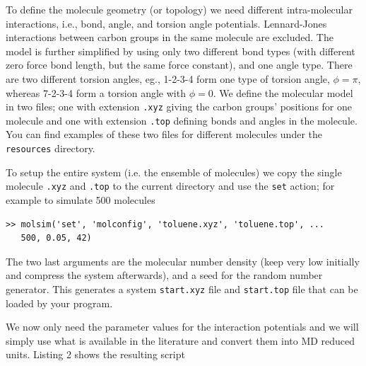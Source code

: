\documentclass[11pt]{article}
\begin{document}
To define the molecule geometry (or topology) we need different intra-molecular
interactions, i.e., bond, angle, and torsion angle potentials. Lennard-Jones
interactions between carbon groups in the same molecule are excluded. The model is
further simplified by using only two different bond types (with different zero
force bond length, but the same force constant), and one angle type. There are two
different torsion angles, eg., 1-2-3-4 form one type of torsion angle,
$\phi=\pi$, whereas 7-2-3-4 form a torsion angle with $\phi=0$. We define the
molecular model in two files; one with extension \verb!.xyz! giving the carbon
groups' positions for one molecule and one with extension \verb!.top!  defining
bonds and angles in the molecule. You can find examples of these two files for
different molecules under the \verb!resources!  directory.

To setup the entire system (i.e. the ensemble of molecules) we copy the single
molecule \verb!.xyz!  and \verb!.top! to the current directory and use the
\verb!set!  action; for example to simulate 500 molecules
\begin{verbatim}
>> molsim('set', 'molconfig', 'toluene.xyz', 'toluene.top', ... 
   500, 0.05, 42)
\end{verbatim}
The two last arguments are the molecular number density (keep very low initially
and compress the system afterwards), and a seed for the random number
generator. This generates a system \verb!start.xyz! file and \verb!start.top!
file that can be loaded by your program. 

We now only need the parameter values for the interaction potentials and we will
simply use what is available in the literature \cite{Hansen} and convert them
into MD reduced units. Listing 2 shows the resulting script

\bigskip
\end{document}
